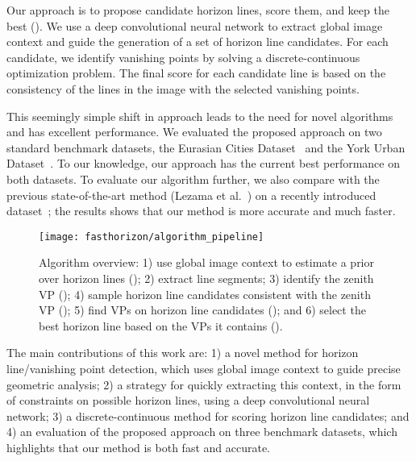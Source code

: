 Our approach is to propose candidate horizon lines, score them, and
keep the best (). We use a deep convolutional neural network to extract
global image context and guide the generation of a set of horizon line
candidates. For each candidate, we identify vanishing points by
solving a discrete-continuous optimization problem.  The final score for
each candidate line is based on the consistency of the lines in the
image with the selected vanishing points. 

This seemingly simple shift in approach leads to the need for novel
algorithms and has excellent performance. We evaluated the proposed
approach on two standard benchmark datasets, the Eurasian Cities
Dataset~\cite{geoparser2010} and the York Urban
Dataset~\cite{edgebased2008}. To our knowledge, our approach has the
current best performance on both datasets. To evaluate our algorithm
further, we also compare with the previous state-of-the-art method
(Lezama et al.~\cite{alignment2014}) on a recently introduced
dataset~\cite{authors2016deephorizon}; the results shows that our
method is more accurate and much faster.

\begin{figure*}
  \centering
  \texttt{[image: fasthorizon/algorithm\_pipeline]}
  \caption{Algorithm overview: 1) use global image context to estimate
    a prior over horizon lines (); 2) extract
    line segments; 3) identify the zenith VP
    (); 4) sample horizon line candidates
    consistent with the zenith VP (); 5) find
    VPs on horizon line candidates (); and 6)
    select the best horizon line based on the VPs it contains
    ().}
  \label{fig:pipeline}
\end{figure*}


The main contributions of this work
are: 1) a novel method for horizon line/vanishing point detection,
which uses global image context to guide precise geometric analysis;
2) a strategy for quickly extracting this context, in the form of
constraints on possible horizon lines, using a deep convolutional
neural network; 3) a discrete-continuous method for scoring horizon
line candidates; and 4) an evaluation of the proposed approach on
three benchmark datasets, which highlights that our method is both
fast and accurate.

